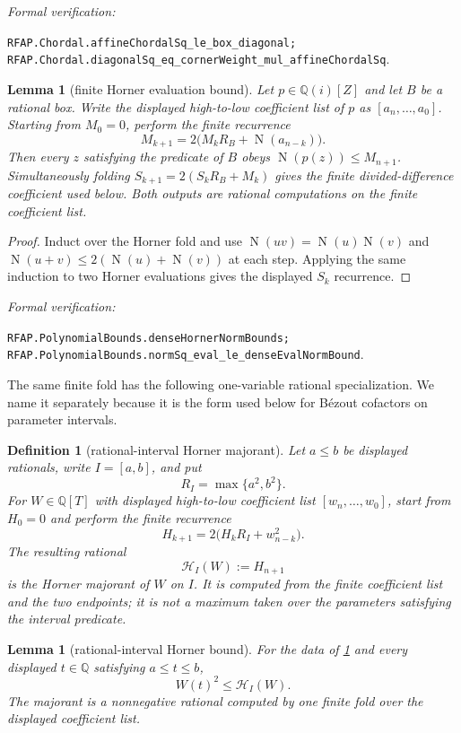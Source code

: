 \documentclass[11pt]{article}
\newtheorem{lemma}[theorem]{Lemma}
\newtheorem{definition}[theorem]{Definition}
\newcommand{\Qi}{\mathbb{Q}(i)}
\newcommand{\Q}{\mathbb{Q}}
\newcommand{\Norm}[1]{\operatorname{N}\!\left(#1\right)}
\newcommand{\leanref}[1]{\par\smallskip\noindent
  \emph{Formal verification:}\par\nobreak
  {\raggedright\nolinkurl{#1}.\par}}
\begin{document}
\leanref{RFAP.Chordal.affineChordalSq_le_box_diagonal;
RFAP.Chordal.diagonalSq_eq_cornerWeight_mul_affineChordalSq}

\begin{lemma}[finite Horner evaluation bound]
\label{lem:eval-bound}
Let $p\in\Qi[Z]$ and let $B$ be a rational box.  Write the displayed
high-to-low coefficient list of $p$ as
$[a_n,\ldots,a_0]$.  Starting from $M_0=0$, perform the finite recurrence
\[
        M_{k+1}=2\bigl(M_kR_B+\Norm{a_{n-k}}\bigr).
\]
Then every $z$ satisfying the predicate of $B$ obeys
$\Norm{p(z)}\le M_{n+1}$.  Simultaneously folding
$S_{k+1}=2(S_kR_B+M_k)$ gives the finite divided-difference coefficient used
below.  Both outputs are rational computations on the finite coefficient
list.
\end{lemma}

\begin{proof}
Induct over the Horner fold and use
$\Norm{uv}=\Norm u\Norm v$ and
$\Norm{u+v}\le2(\Norm u+\Norm v)$ at each step.  Applying the same induction
to two Horner evaluations gives the displayed $S_k$ recurrence.
\end{proof}

\leanref{RFAP.PolynomialBounds.denseHornerNormBounds;
RFAP.PolynomialBounds.normSq_eval_le_denseEvalNormBound}

The same finite fold has the following one-variable rational specialization.
We name it separately because it is the form used below for B\'ezout
cofactors on parameter intervals.

\begin{definition}[rational-interval Horner majorant]
\label{def:interval-horner-majorant}
Let $a\le b$ be displayed rationals, write $I=[a,b]$, and put
\[
                         R_I=\max\{a^2,b^2\}.
\]
For $W\in\Q[T]$ with displayed high-to-low coefficient list
$[w_n,\ldots,w_0]$, start from $H_0=0$ and perform the finite recurrence
\[
                  H_{k+1}=2\bigl(H_kR_I+w_{n-k}^2\bigr).
\]
The resulting rational
\[
                         \mathcal H_I(W):=H_{n+1}
\]
is the \emph{Horner majorant} of $W$ on $I$.  It is computed from the finite
coefficient list and the two endpoints; it is not a maximum taken over the
parameters satisfying the interval predicate.
\end{definition}

\begin{lemma}[rational-interval Horner bound]
\label{lem:interval-horner-majorant}
For the data of \cref{def:interval-horner-majorant} and every displayed
$t\in\Q$ satisfying $a\le t\le b$,
\[
                         W(t)^2\le\mathcal H_I(W).
\]
The majorant is a nonnegative rational computed by one finite fold over the
displayed coefficient list.
\end{lemma}
\end{document}
